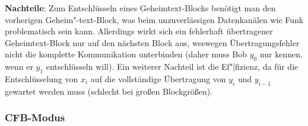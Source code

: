 \textbf{Nachteile}:
Zum Entschlüsseln eines Geheimtext-Blocks benötigt man den vorherigen Geheim"-text-Block,
was beim unzuverlässigen Datenkanälen wie Funk problematisch sein kann.
Allerdings wirkt sich ein fehlerhaft übertragener Geheimtext-Block nur auf den nächsten Block aus,
weswegen Übertragungsfehler nicht die komplette Kommunikation unterbinden
(daher muss Bob $y_0$ nur kennen, wenn er $y_1$ entschlüsseln will).
Ein weiterer Nachteil ist die Ef"|fizienz, da für die Entschlüsselung von $x_i$ auf die
vollständige Übertragung von $y_i$ und $y_{i-1}$ gewartet werden muss
(schlecht bei großen Blockgrößen).

\pagebreak

\subsubsection{%
    CFB-Modus%
}

